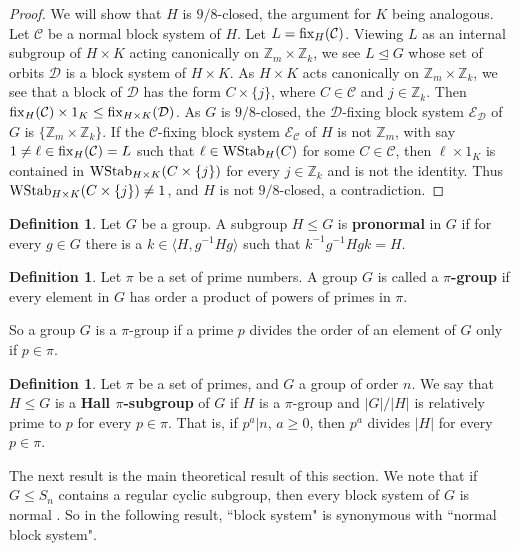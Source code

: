 \documentclass{amsart}
\theoremstyle{definition}
\newtheorem{definition}[thrm]{Definition}
\theoremstyle{remark}
\numberwithin{equation}{section}
\def\Z{{\mathbb Z}}
\def\la{{\langle}}
\def\ra{{\rangle}}
\def\tl{{\unlhd}}
\def\fix{{\rm fix}}
\def\cal{\mathcal}
\def\WStab{{\rm WStab}}
\begin{document}
\begin{proof}
We will show that $H$ is $9/8$-closed, the argument for $K$ being analogous.  Let ${\cal C}$ be a normal block system of $H$.  Let $L = \fix_H({\cal C})$.  Viewing $L$ as an internal subgroup of $H\times K$ acting canonically on $\Z_m\times \Z_k$, we see $L\tl G$ whose set of orbits ${\cal D}$ is a block system of $H\times K$.  As $H\times K$ acts canonically on $\Z_m\times\Z_k$, we see that a block of ${\cal D}$ has the form $C\times\{j\}$, where $C\in{\cal C}$ and $j\in\Z_k$.  Then $\fix_H({\cal C})\times 1_K\le \fix_{H\times K}({\cal D})$.
As $G$ is $9/8$-closed, the ${\cal D}$-fixing block system ${\cal E}_{\cal D}$ of $G$ is $\{\Z_m\times\Z_k\}$.  If the ${\cal C}$-fixing block system ${\cal E}_{\cal C}$ of $H$ is not $\Z_m$, with say $1\not = \ell\in\fix_H({\cal C}) = L$ such that $\ell\in\WStab_H(C)$ for some $C\in{\cal C}$, then $\ell\times 1_K$ is contained in $\WStab_{H\times K}(C\times\{j\})$ for every $j\in\Z_k$ and is not the identity.  Thus $\WStab_{H\times K}(C\times\{j\})\not = 1$, and $H$ is not $9/8$-closed, a contradiction.
\end{proof}

\begin{definition}
Let $G$ be a group.  A subgroup $H\le G$ is {\bf pronormal} in $G$ if for every $g\in G$ there is a $k\in\la H,g^{-1}Hg\ra$ such that $k^{-1}g^{-1}Hgk = H$.
\end{definition}

\begin{definition}
Let $\pi$ be a set of prime numbers.  A group $G$ is called a {\bf $\pi$-group} if every element in $G$ has order a product of powers of primes in $\pi$.
\end{definition}

So a group $G$ is a $\pi$-group if a prime $p$ divides the order of an element of $G$ only if $p\in\pi$.

\begin{definition}
Let $\pi$ be a set of primes, and $G$ a group of order $n$.  We say that $H\le G$ is a {\bf Hall $\pi$-subgroup} of $G$ if $H$ is a $\pi$-group and $\vert G\vert/\vert H\vert$ is relatively prime to $p$ for every $p\in \pi$.  That is, if $p^a\vert n$, $a\ge 0$, then $p^a$ divides $\vert H\vert$ for every $p\in\pi$.
\end{definition}

The next result is the main theoretical result of this section.  We note that if $G\le S_n$ contains a regular cyclic subgroup, then every block system of $G$ is normal \cite[Theorem 2.2.9]{Book}.  So in the following result, ``block system" is synonymous with ``normal block system".
\end{document}
